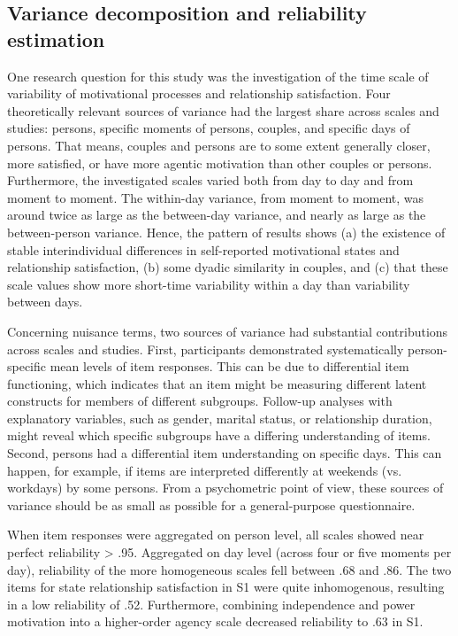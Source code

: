 \documentclass[jou,a4paper,draftfirst]{apa6}\usepackage[]{graphicx}\usepackage[]{color}
\begin{document}
\subsection{Variance decomposition and reliability estimation}

One research question for this study was the investigation of the time scale of variability of motivational processes and relationship satisfaction. Four theoretically relevant sources of variance had the largest share across scales and studies: persons, specific moments of persons, couples, and specific days of persons. That means, couples and persons are to some extent generally closer, more satisfied, or have more agentic motivation than other couples or persons. Furthermore, the investigated scales varied both from day to day and from moment to moment. The within-day variance, from moment to moment, was around twice as large as the between-day variance, and nearly as large as the between-person variance. Hence, the pattern of results shows (a) the existence of stable interindividual differences in self-reported motivational states and relationship satisfaction, (b) some dyadic similarity in couples, and (c) that these scale values show more short-time variability within a day than variability between days.

Concerning nuisance terms, two sources of variance had substantial contributions across scales and studies. First, participants demonstrated systematically person-specific mean levels of item responses. This can be due to differential item functioning, which indicates that an item might be measuring different latent constructs for members of different subgroups. Follow-up analyses with explanatory variables, such as gender, marital status, or relationship duration, might reveal which specific subgroups have a differing understanding of items. Second, persons had a differential item understanding on specific days. This can happen, for example, if items are interpreted differently at weekends (vs. workdays) by some persons. From a psychometric point of view, these sources of variance should be as small as possible for a general-purpose questionnaire.

When item responses were aggregated on person level, all scales showed near perfect reliability > .95. Aggregated on day level (across four or five moments per day), reliability of the more homogeneous scales fell between .68 and .86. The two items for state relationship satisfaction in S1 were quite inhomogenous, resulting in a low reliability of .52. Furthermore, combining independence and power motivation into a higher-order agency scale decreased reliability to .63 in S1.
\end{document}
